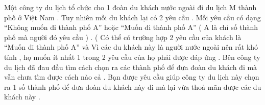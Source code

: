 Một công ty du lịch tổ chức cho 1 đoàn du khách nước ngoài đi du lịch M thành phố ở Việt Nam . Tuy nhiên mỗi du khách lại có 2 yêu cầu . Mỗi yêu cầu có dạng “Không muốn đi thành phố A” hoặc “Muốn đi thành phố A” ( A là chỉ số thành phố mà người đó yêu cầu ) . ( Có thể có trường hợp 2 yêu cầu của khách là “Muốn đi thành phố A” và  Vì các du khách này là người nước ngoài nên rất khó tính , họ muốn ít nhất  1 trong 2 yêu cầu của họ phải được đáp ứng . Bên công ty du lịch đã đau đầu tìm cách chọn ra các thành phố để đưa đoàn du khách đi mà vẫn chưa tìm được cách nào cả . Bạn được yêu cầu giúp công ty du lịch này chọn ra 1 số thành phố để đưa đoàn du khách này đi mà lại vừa thoả mãn được các du khách này .